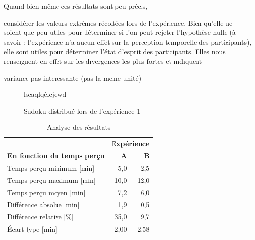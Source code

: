 \documentclass[12pt,fleqn,oneside,openany]{book} %
\begin{document}
Quand bien même ces résultats sont peu précis, 

considérer les valeurs extrêmes récoltées lors de l'expérience. Bien qu'elle ne soient que peu utiles pour déterminer si l'on peut rejeter l'hypothèse nulle (à savoir : l'expérience n'a aucun effet sur la perception temporelle des participants), elle sont utiles pour déterminer l'état d'esprit des participants. Elles nous renseignent en effet sur les divergences les plus fortes et indiquent 

variance pas interessante (pas la meme unité) 


\begin{figure}[h!]
\centering
\begin{minipage}[t]{.49\textwidth}
		\caption{lscaqlqélcjqwd}
\end{minipage}
\hfill
\begin{minipage}[t]{.49\textwidth}
		\caption{Sudoku distribué lors de l'expérience 1}
\end{minipage}
\end{figure}

\begin{table}[h!]
	\centering
	\caption{Analyse des résultats} \label{tbl:analyse1.1}
	\begin{tabular}{lrr}
		\toprule
		& \multicolumn{2}{r}{\textbf{Expérience}} \\ 
		\textbf{En fonction du temps perçu} & \textbf{A} & \textbf{B} \\ \midrule
		Temps perçu minimum [min] & 5,0 & 2,5 \\ 
		Temps perçu maximum [min] & 10,0 & 12,0 \\
		Temps perçu moyen [min] & 7,2 & 6,0 \\
		Différence absolue [min] & 1,9 & 0,5 \\ 
		Différence relative [\%] & 35,0 & 9,7 \\ 
		Écart type [min] & 2,00 & 2,58 \\ \bottomrule
	\end{tabular}
\end{table}
\end{document}
